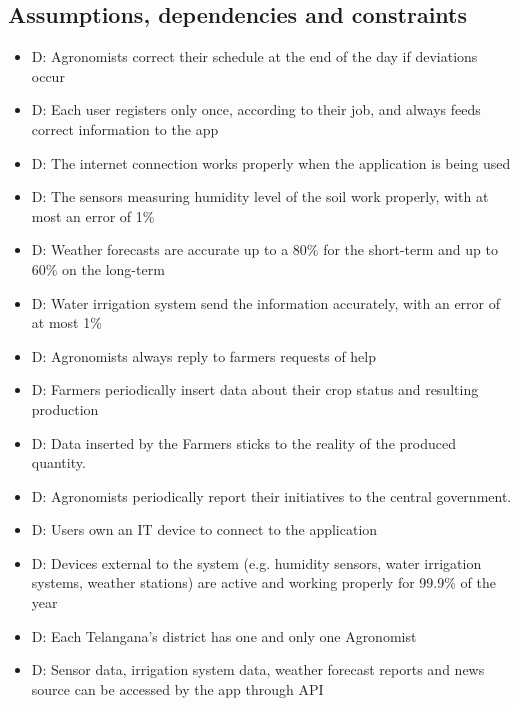 \documentclass[table, 12pt]{article}
\begin{document}
\subsection{Assumptions, dependencies and constraints}
\begin{itemize}
    \item {}D: Agronomists correct their schedule at the end of the day if deviations occur
    \item {}D: Each user registers only once, according to their job, and always feeds correct information to the app
    \item {}D: The internet connection works properly when the application is being used\footnotemark
    \item {}D: The sensors measuring humidity level of the soil work properly, with at most an error of 1\%
    \item {}D: Weather forecasts are accurate up to a 80\% for the short-term and up to 60\% on the long-term
    \item {}D: Water irrigation system send the information accurately, with an error of at most 1\%
    \item {}D: Agronomists always reply to farmers requests of help
    \item {}D: Farmers periodically insert data about their crop status and resulting production
    \item {}D: Data inserted by the Farmers sticks to the reality of the produced quantity.
    \item {}D: Agronomists periodically report their initiatives to the central government.
    \item {}D: Users own an IT device to connect to the application
    \item {}D: Devices external to the system (e.g. humidity sensors, water irrigation systems, weather stations) are active and working properly for 99.9\% of the year
    \item {}D: Each Telangana's district has one and only one Agronomist\footnotemark[\value{footnote}]
    \item {}D: Sensor data, irrigation system data, weather forecast reports and news source can be accessed by the app through API
\end{itemize}
\newpage
\end{document}
